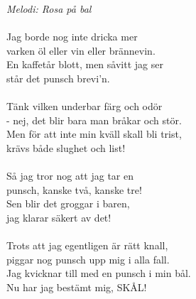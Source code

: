{\footnotesize\textit{Melodi: Rosa på bal }}\\
\\
Jag borde nog inte dricka mer\\
varken öl eller vin eller brännevin.\\
En kaffetår blott, men såvitt jag ser\\
står det punsch brevi'n.\\
\\
Tänk vilken underbar färg och odör \\
 - nej, det blir bara man bråkar och stör.\\
Men för att inte min kväll skall bli trist,\\
krävs både slughet och list!\\
\\
Så jag tror nog att jag tar en\\
punsch, kanske två, kanske tre!\\
Sen blir det groggar i baren,\\
jag klarar säkert av det!\\
\\
Trots att jag egentligen är rätt knall,\\
piggar nog punsch upp mig i alla fall.\\
Jag kvicknar till med en punsch i min bål.\\
Nu har jag bestämt mig, SKÅL!
